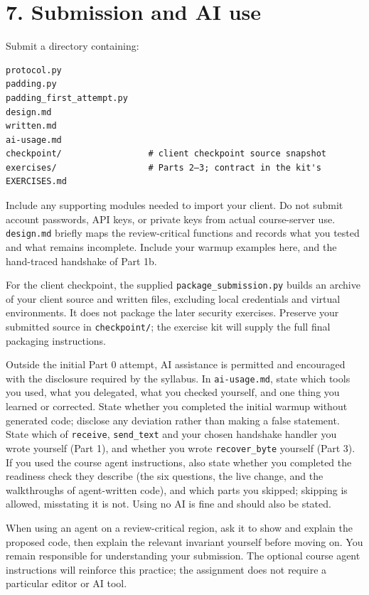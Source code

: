 \documentclass[11pt]{article}
\begin{document}
\section*{7. Submission and AI use}

Submit a directory containing:

\begin{small}\begin{verbatim}
protocol.py
padding.py
padding_first_attempt.py
design.md
written.md
ai-usage.md
checkpoint/                 # client checkpoint source snapshot
exercises/                  # Parts 2–3; contract in the kit's EXERCISES.md
\end{verbatim}\end{small}

Include any supporting modules needed to import your client. Do not submit account passwords, API keys, or private keys from actual course-server use. \texttt{design.md} briefly maps the review-critical functions and records what you tested and what remains incomplete. Include your warmup examples here, and the hand-traced handshake of Part 1b.

For the client checkpoint, the supplied \texttt{package\_submission.py} builds an archive of your client source and written files, excluding local credentials and virtual environments. It does not package the later security exercises. Preserve your submitted source in \texttt{checkpoint/}; the exercise kit will supply the full final packaging instructions.

Outside the initial Part 0 attempt, AI assistance is permitted and encouraged with the disclosure required by the syllabus. In \texttt{ai-{}usage.md}, state which tools you used, what you delegated, what you checked yourself, and one thing you learned or corrected. State whether you completed the initial warmup without generated code; disclose any deviation rather than making a false statement. State which of \texttt{receive}, \texttt{send\_text} and your chosen handshake handler you wrote yourself (Part 1), and whether you wrote \texttt{recover\_byte} yourself (Part 3). If you used the course agent instructions, also state whether you completed the readiness check they describe (the six questions, the live change, and the walkthroughs of agent-written code), and which parts you skipped; skipping is allowed, misstating it is not. Using no AI is fine and should also be stated.

When using an agent on a review-critical region, ask it to show and explain the proposed code, then explain the relevant invariant yourself before moving on. You remain responsible for understanding your submission. The optional course agent instructions will reinforce this practice; the assignment does not require a particular editor or AI tool.
\end{document}
